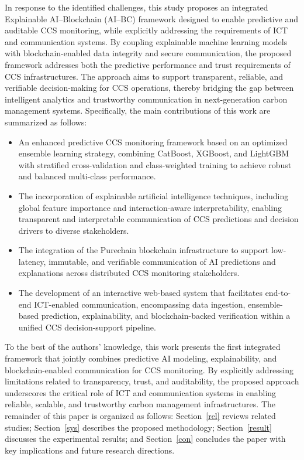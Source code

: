 \documentclass[conference]{IEEEtran}
\begin{document}
In response to the identified challenges, this study proposes an integrated Explainable AI--Blockchain (AI--BC) framework designed to enable predictive and auditable CCS monitoring, while explicitly addressing the requirements of ICT and communication systems. By coupling explainable machine learning models with blockchain-enabled data integrity and secure communication, the proposed framework addresses both the predictive performance and trust requirements of CCS infrastructures. The approach aims to support transparent, reliable, and verifiable decision-making for CCS operations, thereby bridging the gap between intelligent analytics and trustworthy communication in next-generation carbon management systems. Specifically, the main contributions of this work are summarized as follows:
\begin{itemize}

    \item An enhanced predictive CCS monitoring framework based on an optimized ensemble learning strategy, combining CatBoost, XGBoost, and LightGBM with stratified cross-validation and class-weighted training to achieve robust and balanced multi-class performance.
    
    \item The incorporation of explainable artificial intelligence techniques, including global feature importance and interaction-aware interpretability, enabling transparent and interpretable communication of CCS predictions and decision drivers to diverse stakeholders.
    
    \item The integration of the Purechain blockchain infrastructure to support low-latency, immutable, and verifiable communication of AI predictions and explanations across distributed CCS monitoring stakeholders.
    
    \item The development of an interactive web-based system that facilitates end-to-end ICT-enabled communication, encompassing data ingestion, ensemble-based prediction, explainability, and blockchain-backed verification within a unified CCS decision-support pipeline.
\end{itemize}

To the best of the authors’ knowledge, this work presents the first integrated framework that jointly combines predictive AI modeling, explainability, and blockchain-enabled communication for CCS monitoring. By explicitly addressing limitations related to transparency, trust, and auditability, the proposed approach underscores the critical role of ICT and communication systems in enabling reliable, scalable, and trustworthy carbon management infrastructures. The remainder of this paper is organized as follows: Section~\ref{rel} reviews related studies; Section~\ref{sys} describes the proposed methodology; Section~\ref{result} discusses the experimental results; and Section~\ref{con} concludes the paper with key implications and future research directions.
\end{document}
